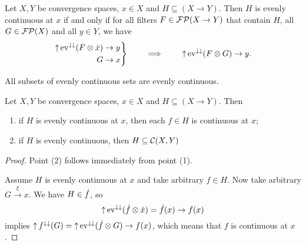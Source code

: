 \begin{lemma} \label{evenlyContinuousLemma}
Let $X,Y$ be convergence spaces, $x\in X$ and $H\subseteq (X\to Y)$. Then $H$ is evenly continuous at $x$ \textup{if and only if} for all filters $F\in \operatorname{\mathcal{FP}}(X\to Y)$ that contain $H$, all $G\in \operatorname{\mathcal{FP}}(X)$ and all $y\in Y$, we have
\[ \left.\begin{aligned}
\operatorname{\uparrow}\operatorname{ev}^{\downarrow\downarrow}(F\otimes \dot{x}) &\to y \\
G&\to x
\end{aligned}\right\}\qquad\implies\qquad \operatorname{\uparrow}\operatorname{ev}^{\downarrow\downarrow}(F\otimes G)\to y. \]
\end{lemma}

\begin{lemma} \label{evenlyContinuousSubset}
All subsets of evenly continuous sets are evenly continuous.
\end{lemma}

\begin{lemma}
Let $X,Y$ be convergence spaces, $x\in X$ and $H\subseteq (X\to Y)$. Then
\begin{enumerate}
\item if $H$ is evenly continuous at $x$, then each $f\in H$ is continuous at $x$;
\item if $H$ is evenly continuous, then $H \subseteq \operatorname{\mathcal{C}}(X,Y)$
\end{enumerate}
\end{lemma}
\begin{proof}
Point (2) follows immediately from point (1).

Assume $H$ is evenly continuous at $x$ and take arbitrary $f\in H$. Now take arbitrary $G\overset{\xi}{\longrightarrow} x$. We have $H\in \dot{f}$, so
\[ \operatorname{\uparrow}\operatorname{ev}^{\downarrow\downarrow}(\dot{f}\otimes \dot{x}) = \dot{f}(x) \to f(x) \]
implies $\operatorname{\uparrow} f^{\downarrow\downarrow}(G) = \operatorname{\uparrow}\operatorname{ev}^{\downarrow\downarrow}(\dot{f}\otimes G) \to f(x)$, which means that $f$ is continuous at $x$.
\end{proof}

